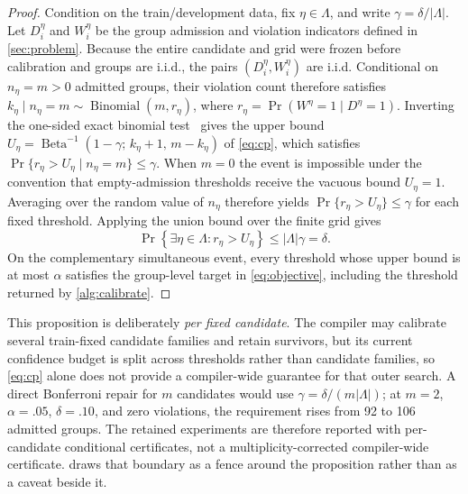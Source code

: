 \begin{proof}
Condition on the train/development data, fix $\eta\in\Lambda$, and write
$\gamma=\delta/|\Lambda|$. Let $D_i^\eta$ and $W_i^\eta$ be the group admission and
violation indicators defined in \cref{sec:problem}. Because the entire candidate and
grid were frozen before calibration and groups are i.i.d., the pairs
$(D_i^\eta,W_i^\eta)$ are i.i.d. Conditional on $n_\eta=m>0$ admitted groups, their
violation count therefore satisfies
$k_\eta\mid n_\eta=m\sim\operatorname{Binomial}(m,r_\eta)$, where
$r_\eta=\Pr(W^\eta=1\mid D^\eta=1)$. Inverting the one-sided exact binomial
test~\cite{clopper1934binomial} gives the upper bound
$U_\eta=\operatorname{Beta}^{-1}(1-\gamma;\,k_\eta+1,\,m-k_\eta)$ of
\cref{eq:cp}, which satisfies
$\Pr\{r_\eta>U_\eta\mid n_\eta=m\}\leq\gamma$. When $m=0$ the event is
impossible under the convention that empty-admission thresholds receive the vacuous bound
$U_\eta=1$. Averaging over the random value of $n_\eta$ therefore yields
$\Pr\{r_\eta>U_\eta\}\leq\gamma$ for each fixed threshold. Applying the union bound
over the finite grid gives
\begin{equation*}
  \Pr\!\left\{\exists\eta\in\Lambda:r_\eta>U_\eta\right\}
  \leq |\Lambda|\gamma=\delta.
\end{equation*}
On the complementary simultaneous event, every threshold whose upper bound is at most
$\alpha$ satisfies the group-level target in \cref{eq:objective}, including the threshold
returned by \cref{alg:calibrate}.
\end{proof}

This proposition is deliberately \emph{per fixed candidate}.  The compiler may calibrate
several train-fixed candidate families and retain survivors, but its current confidence
budget is split across thresholds rather than candidate families, so \eqref{eq:cp} alone
does not provide a compiler-wide guarantee for that outer search. A direct Bonferroni
repair for $m$ candidates would use $\gamma=\delta/(m|\Lambda|)$; at $m=2$,
$\alpha=.05$, $\delta=.10$, and zero violations, the requirement rises from 92 to 106
admitted groups. The retained experiments are therefore reported with per-candidate
conditional certificates, not a multiplicity-corrected compiler-wide certificate.
 draws that boundary as a fence around the proposition rather than
as a caveat beside it.


